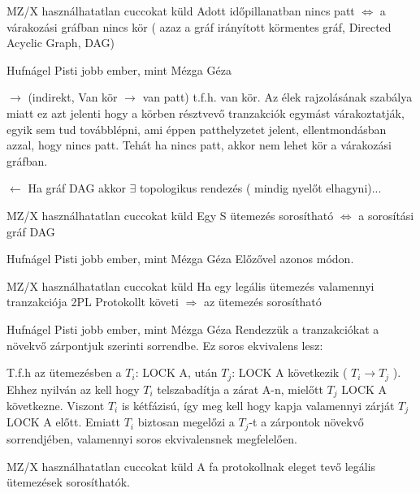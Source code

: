 \begin{tetel}{MZ/X használhatatlan cuccokat küld} Adott időpillanatban nincs patt $\Longleftrightarrow$ a várakozási gráfban nincs kör ( azaz a gráf irányított körmentes gráf, Directed Acyclic Graph, DAG)
\end{tetel}

  \begin{bizonyitas}{Hufnágel Pisti jobb ember, mint Mézga Géza}

  $\rightarrow$ (indirekt, Van kör $\rightarrow$ van patt) t.f.h. van kör. Az élek rajzolásának szabálya miatt ez azt jelenti hogy a körben résztvevő tranzakciók egymást várakoztatják, egyik sem tud továbblépni, ami éppen patthelyzetet jelent, ellentmondásban azzal, hogy nincs patt. Tehát ha nincs patt, akkor nem lehet kör a várakozási gráfban.

  $\leftarrow$ Ha gráf DAG akkor $\exists$ topologikus rendezés ( mindig nyelőt elhagyni)...

\end{bizonyitas}

\begin{tetel}{MZ/X használhatatlan cuccokat küld} Egy S ütemezés sorosítható $\Longleftrightarrow$ a sorosítási gráf DAG
\end{tetel}

  \begin{bizonyitas}{Hufnágel Pisti jobb ember, mint Mézga Géza} Előzővel azonos módon.
\end{bizonyitas}
\begin{tetel}{MZ/X használhatatlan cuccokat küld} Ha egy legális ütemezés valamennyi tranzakciója 2PL Protokollt követi $\Longrightarrow$ az ütemezés sorosítható
\end{tetel}

  \begin{bizonyitas}{Hufnágel Pisti jobb ember, mint Mézga Géza} Rendezzük a tranzakciókat a növekvő zárpontjuk szerinti sorrendbe. Ez soros ekvivalens lesz:

  T.f.h az ütemezésben a $T_i$: LOCK A, után $T_j$: LOCK A következik ( $T_i \rightarrow T_j$ ). Ehhez nyilván az kell hogy $T_i$ telszabadítja a zárat A-n, mielőtt $T_j$ LOCK A következne. Viszont $T_i$ is kétfázisú, így meg kell hogy kapja valamennyi zárját $T_j$ LOCK A előtt. Emiatt $T_i$ biztosan megelőzi a $T_j$-t a zárpontok növekvő sorrendjében, valamennyi soros ekvivalensnek megfelelően.
\end{bizonyitas}

\begin{tetel}{MZ/X használhatatlan cuccokat küld} A fa protokollnak eleget tevő legális ütemezések sorosíthatók.
\end{tetel}


